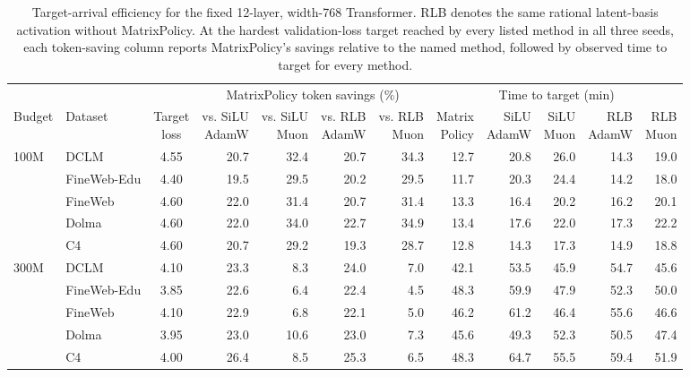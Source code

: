 \begin{table}[H]
\centering
\caption{Target-arrival efficiency for the fixed 12-layer, width-768 Transformer. RLB denotes the same rational latent-basis activation without MatrixPolicy. At the hardest validation-loss target reached by every listed method in all three seeds, each token-saving column reports MatrixPolicy's savings relative to the named method, followed by observed time to target for every method.}
\label{tab:e1e2-silu-comparison}
\begingroup
\footnotesize
\setlength{\tabcolsep}{1.9pt}
\renewcommand{\arraystretch}{1.04}
\begin{tabular}{@{}llc*{4}{r}@{\hspace{0.55em}}*{5}{r}@{}}
\toprule
& & & \multicolumn{4}{c}{MatrixPolicy token savings (\%)} & \multicolumn{5}{c}{Time to target (min)} \\
\cmidrule(lr){4-7}\cmidrule(l){8-12}
Budget & Dataset & \shortstack{Target\\loss} & \shortstack{vs. SiLU\\AdamW} & \shortstack{vs. SiLU\\Muon} & \shortstack{vs. RLB\\AdamW} & \shortstack{vs. RLB\\Muon} & \shortstack{Matrix\\Policy} & \shortstack{SiLU\\AdamW} & \shortstack{SiLU\\Muon} & \shortstack{RLB\\AdamW} & \shortstack{RLB\\Muon} \\
\midrule
100M & DCLM & 4.55 & 20.7 & 32.4 & 20.7 & 34.3 & 12.7 & 20.8 & 26.0 & 14.3 & 19.0 \\
 & FineWeb-Edu & 4.40 & 19.5 & 29.5 & 20.2 & 29.5 & 11.7 & 20.3 & 24.4 & 14.2 & 18.0 \\
 & FineWeb & 4.60 & 22.0 & 31.4 & 20.7 & 31.4 & 13.3 & 16.4 & 20.2 & 16.2 & 20.1 \\
 & Dolma & 4.60 & 22.0 & 34.0 & 22.7 & 34.9 & 13.4 & 17.6 & 22.0 & 17.3 & 22.2 \\
 & C4 & 4.60 & 20.7 & 29.2 & 19.3 & 28.7 & 12.8 & 14.3 & 17.3 & 14.9 & 18.8 \\
\addlinespace[1pt]\midrule
300M & DCLM & 4.10 & 23.3 & 8.3 & 24.0 & 7.0 & 42.1 & 53.5 & 45.9 & 54.7 & 45.6 \\
 & FineWeb-Edu & 3.85 & 22.6 & 6.4 & 22.4 & 4.5 & 48.3 & 59.9 & 47.9 & 52.3 & 50.0 \\
 & FineWeb & 4.10 & 22.9 & 6.8 & 22.1 & 5.0 & 46.2 & 61.2 & 46.4 & 55.6 & 46.6 \\
 & Dolma & 3.95 & 23.0 & 10.6 & 23.0 & 7.3 & 45.6 & 49.3 & 52.3 & 50.5 & 47.4 \\
 & C4 & 4.00 & 26.4 & 8.5 & 25.3 & 6.5 & 48.3 & 64.7 & 55.5 & 59.4 & 51.9 \\
\bottomrule
\end{tabular}
\endgroup
\end{table}
